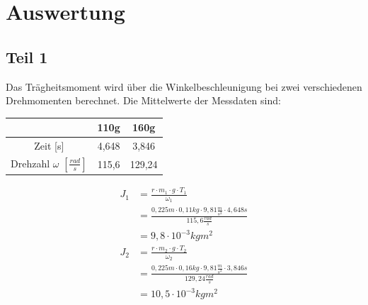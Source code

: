 \documentclass[12pt,a4paper,]{scrreprt}
\begin{document}
	\chapter{Auswertung}
		\section{Teil 1}
			Das Trägheitsmoment wird über die Winkelbeschleunigung bei zwei verschiedenen Drehmomenten berechnet. Die Mittelwerte der Messdaten sind: \\
            \begin{center}
            \begin{tabular}{c|cc}
            					&110g 	& 160g\\ \hline \hline
                Zeit [s]& 4,648 		& 3,846\\
                Drehzahl $\omega$ $[\frac{rad}{s}]$& 115,6 &  129,24 
            \end{tabular}
            \end{center}
            
            
            \begin{align*}
            	J_1 & = \frac{r\cdot m_1 \cdot g \cdot T_1}{\omega_1} \\
                & = \frac{0,225 m \cdot 0,11kg \cdot 9,81 \frac{m}{s^2} \cdot 4,648s}{115,6 \frac{rad}{s}}   \\
                & = 9,8 \cdot 10^{-3}kgm^2
            \end{align*}
           	\begin{align*}
            	J_2 & = \frac{r\cdot m_2 \cdot g \cdot T_2}{\omega_2} \\
                & =  \frac{0,225m \cdot 0,16kg \cdot 9,81 \frac{m}{s^2} \cdot 3,846 s}{129,24 \frac{rad}{s}}  \\
                & = 10,5 \cdot 10^{-3}kgm^2
            \end{align*}
            
         \pagebreak
         
\end{document}
